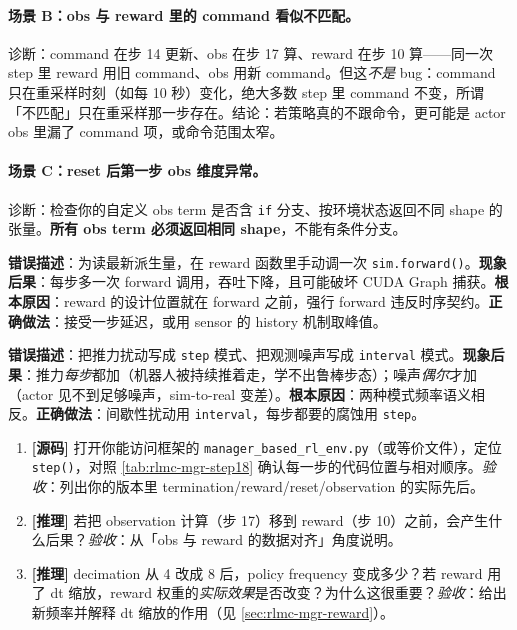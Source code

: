 \paragraph{场景 B：obs 与 reward 里的 command 看似不匹配。}诊断：command 在步 14 更新、obs 在步 17 算、reward 在步 10 算——同一次 step 里 reward 用旧 command、obs 用新 command。但这\emph{不是} bug：command 只在重采样时刻（如每 10 秒）变化，绝大多数 step 里 command 不变，所谓「不匹配」只在重采样那一步存在。结论：若策略真的不跟命令，更可能是 actor obs 里漏了 command 项，或命令范围太窄。

\paragraph{场景 C：reset 后第一步 obs 维度异常。}诊断：检查你的自定义 obs term 是否含 \verb|if| 分支、按环境状态返回不同 shape 的张量。\textbf{所有 obs term 必须返回相同 shape}，不能有条件分支。

\begin{pitfall}
\textbf{错误描述}：为读最新派生量，在 reward 函数里手动调一次 \verb|sim.forward()|。\textbf{现象后果}：每步多一次 forward 调用，吞吐下降，且可能破坏 CUDA Graph 捕获。\textbf{根本原因}：reward 的设计位置就在 forward 之前，强行 forward 违反时序契约。\textbf{正确做法}：接受一步延迟，或用 sensor 的 history 机制取峰值。
\end{pitfall}

\begin{pitfall}
\textbf{错误描述}：把推力扰动写成 \verb|step| 模式、把观测噪声写成 \verb|interval| 模式。\textbf{现象后果}：推力\emph{每步}都加（机器人被持续推着走，学不出鲁棒步态）；噪声\emph{偶尔}才加（actor 见不到足够噪声，sim-to-real 变差）。\textbf{根本原因}：两种模式频率语义相反。\textbf{正确做法}：间歇性扰动用 \verb|interval|，每步都要的腐蚀用 \verb|step|。
\end{pitfall}

\begin{practice}[本节练习]
\begin{enumerate}
  \item \textbf{[源码]} 打开你能访问框架的 \verb|manager_based_rl_env.py|（或等价文件），定位 \verb|step()|，对照 \cref{tab:rlmc-mgr-step18} 确认每一步的代码位置与相对顺序。\emph{验收}：列出你的版本里 termination/reward/reset/observation 的实际先后。
  \item \textbf{[推理]} 若把 observation 计算（步 17）移到 reward（步 10）之前，会产生什么后果？\emph{验收}：从「obs 与 reward 的数据对齐」角度说明。
  \item \textbf{[推理]} decimation 从 4 改成 8 后，policy frequency 变成多少？若 reward 用了 dt 缩放，reward 权重的\emph{实际效果}是否改变？为什么这很重要？\emph{验收}：给出新频率并解释 dt 缩放的作用（见 \cref{sec:rlmc-mgr-reward}）。
\end{enumerate}
\end{practice}

